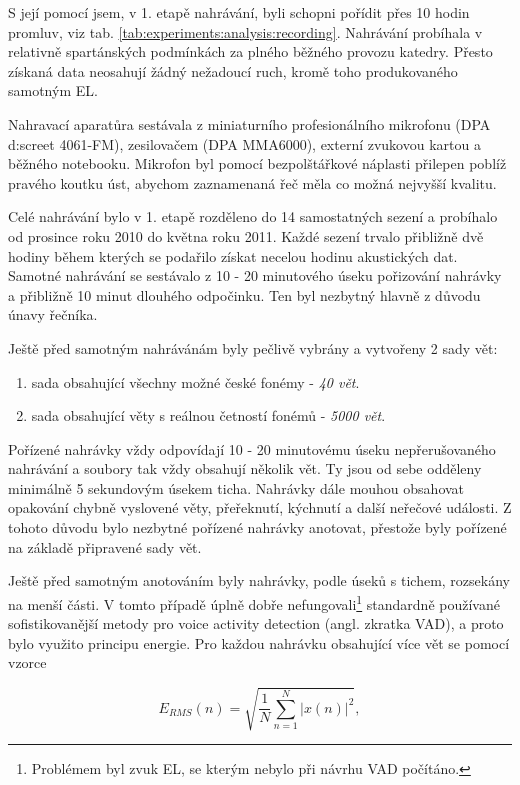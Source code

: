 S její pomocí jsem, v 1. etapě nahrávání, byli schopni pořídit přes 10 hodin promluv, viz tab. \ref{tab:experiments:analysis:recording}. Nahrávání probíhala v relativně spartánských podmínkách za plného běžného provozu katedry. Přesto získaná data neosahují žádný nežadoucí ruch, kromě toho produkovaného samotným EL.

Nahravací aparatůra sestávala z miniaturního profesionálního mikrofonu (DPA d:screet 4061-FM), zesilovačem (DPA MMA6000), externí zvukovou kartou a běžného notebooku. Mikrofon byl pomocí bezpolštářkové náplasti přilepen poblíž pravého koutku úst, abychom zaznamenaná řeč měla co možná nejvyšší kvalitu.

Celé nahrávání bylo v 1. etapě rozděleno do 14 samostatných sezení a probíhalo od prosince roku 2010 do května roku 2011. Každé sezení trvalo přibližně dvě hodiny během kterých se podařilo získat necelou hodinu akustických dat. Samotné nahrávání se sestávalo z 10 - 20 minutového úseku pořizování nahrávky a přibližně 10 minut dlouhého odpočinku. Ten byl nezbytný hlavně z důvodu únavy řečníka.

Ještě před samotným nahrávánám byly pečlivě vybrány a vytvořeny 2 sady vět:

\begin{enumerate}
  \item sada obsahující všechny možné české fonémy - \textit{40 vět}.
  \item sada obsahující věty s reálnou četností fonémů - \textit{5000 vět}.
\end{enumerate}

\noindent Pořízené nahrávky vždy odpovídají 10 - 20 minutovému úseku nepřerušovaného nahrávání a soubory tak vždy obsahují několik vět. Ty jsou od sebe odděleny minimálně 5 sekundovým úsekem ticha. Nahrávky dále mouhou obsahovat opakování chybně vyslovené věty, přeřeknutí, kýchnutí a další neřečové události. Z tohoto důvodu bylo nezbytné pořízené nahrávky anotovat, přestože byly pořízené na základě připravené sady vět.

Ještě před samotným anotováním byly nahrávky, podle úseků s tichem, rozsekány na menší části. V tomto případě úplně dobře nefungovali\footnote{Problémem byl zvuk EL, se kterým nebylo při návrhu VAD počítáno.} standardně používané sofistikovanější metody pro voice activity detection (angl. zkratka VAD), a proto bylo využito principu energie. Pro každou nahrávku obsahující více vět se pomocí vzorce

\begin{equation}
  \label{eq:experiments:analysis:energy}
  E_{RMS}(n) = \sqrt{\frac{1}{N} \sum_{n=1}^{N} \left| x(n) \right|^2},
\end{equation}

